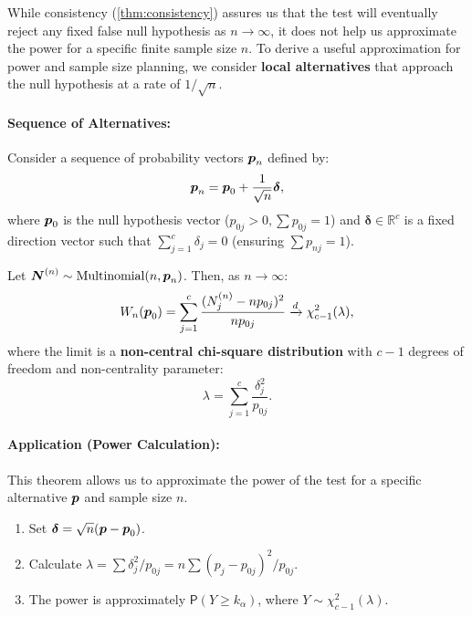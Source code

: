 While consistency (\autoref{thm:consistency}) assures us that the test will eventually reject any fixed false null hypothesis as $n \to \infty$, it does not help us approximate the power for a specific finite sample size $n$. To derive a useful approximation for power and sample size planning, we consider \textbf{local alternatives} that approach the null hypothesis at a rate of $1/\sqrt{n}$.

\paragraph{Sequence of Alternatives:}
Consider a sequence of probability vectors $\boldsymbol{p}_n$ defined by:
\[
    \boldsymbol{p}_n = \boldsymbol{p}_0 + \frac{1}{\sqrt{n}} \boldsymbol{\delta},
\]
where $\boldsymbol{p}_0$ is the null hypothesis vector ($p_{0j} > 0, \sum p_{0j} = 1$) and $\boldsymbol{\delta} \in \mathbb{R}^c$ is a fixed direction vector such that $\sum_{j=1}^c \delta_j = 0$ (ensuring $\sum p_{nj} = 1$).

\begin{theo}
    \label{thm:LocalPower}
    Let $\boldsymbol{N}^{(n)} \sim \text{Multinomial}(n, \boldsymbol{p}_n)$. Then, as $n \to \infty$:
    \[
        W_n(\boldsymbol{p}_0) = \sum\limits_{j=1}^c \frac{(N_j^{(n)} - n p_{0j})^2}{n p_{0j}} \xrightarrow{d} \chi_{c-1}^2 (\lambda),
    \]
    where the limit is a \textbf{non-central chi-square distribution} with $c-1$ degrees of freedom and non-centrality parameter:
    \[
        \lambda = \sum\limits_{j=1}^c \frac{\delta_j^2}{p_{0j}}.
    \]
\end{theo}



\paragraph{Application (Power Calculation):}
This theorem allows us to approximate the power of the test for a specific alternative $\boldsymbol{p}$ and sample size $n$.
\begin{enumerate}[]
    \item 
 Set $\boldsymbol{\delta} = \sqrt{n}(\boldsymbol{p} - \boldsymbol{p}_0)$.
\item   Calculate $\lambda = \sum \delta_j^2 / p_{0j} = n \sum (p_j - p_{0j})^2 / p_{0j}$.
\item   The power is approximately $\mathsf{P}(Y \ge k_\alpha)$, where $Y \sim \chi^2_{c-1}(\lambda)$.
\end{enumerate}

